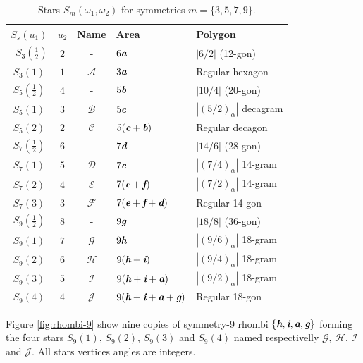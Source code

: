 \documentclass[11pt]{article}
\def\mathbi#1{\textbf{\em #1}}
\begin{document}
\begin{table}[H]
\begin{center}
\begin{tabular}{|c|c|c|l|l|}
\hline
$S_s(u_1)$ & $u_2$ & Name & Area & Polygon \\ \hline\
$S_3(\frac{1}2)$ & $2$ & -     & $6\mathbi{a}$ & $|6/2|$ (12-gon) \\[0.5ex]
$S_3(1)$         & $1$ & $\mathcal{A}$ & $3\mathbi{a}$ & Regular hexagon \\[0.5ex]
\hline
$S_5(\frac{1}2)$ & $4$ & -      & $5\mathbi{b}$ & $|10/4|$ (20-gon)\\[0.5ex]
$S_5(1)$ & $3$ & $\mathcal{B}$ & $5\mathbi{c}$ & $|(5/2)_\alpha|$ decagram\\[0.5ex]
$S_5(2)$ & $2$ & $\mathcal{C}$ & $5(\mathbi{c}+\mathbi{b})$ & Regular decagon\\[0.5ex]
\hline
$S_7(\frac{1}2)$ & $6$ & -     & $7\mathbi{d}$ & $|14/6|$ (28-gon)\\[0.5ex]
$S_7(1)$ & $5$ & $\mathcal{D}$ & $7\mathbi{e}$ & $|(7/4)_\alpha|$ 14-gram\\[0.5ex]
$S_7(2)$ & $4$ & $\mathcal{E}$ & $7(\mathbi{e}+\mathbi{f})$ & $|(7/2)_\alpha|$ 14-gram\\[0.5ex]
$S_7(3)$ & $3$ & $\mathcal{F}$ & $7(\mathbi{e}+\mathbi{f}+\mathbi{d})$ & Regular 14-gon\\[0.5ex]
\hline
$S_9(\frac{1}2)$ & $8$ & -     & $9\mathbi{g}$ & $|18/8|$ (36-gon)\\[0.5ex]
$S_9(1)$ & $7$ & $\mathcal{G}$ & $9\mathbi{h}$ & $|(9/6)_\alpha|$ 18-gram\\[0.5ex]
$S_9(2)$ & $6$ & $\mathcal{H}$ & $9(\mathbi{h}+\mathbi{i})$ & $|(9/4)_\alpha|$ 18-gram\\[0.5ex]
$S_9(3)$ & $5$ & $\mathcal{I}$ & $9(\mathbi{h}+\mathbi{i}+\mathbi{a})$ & $|(9/2)_\alpha|$ 18-gram\\[0.5ex]
$S_9(4)$ & $4$ & $\mathcal{J}$ & $9(\mathbi{h}+\mathbi{i}+\mathbi{a}+\mathbi{g})$ & Regular 18-gon\\[0.5ex]
\hline
\end{tabular}
\caption{Stars $S_m(\omega_1,\omega_2)$ for symmetries $m=\{3,5,7,9\}$.}
\label{tbl:stars}
\end{center}
\end{table}

Figure \ref{fig:rhombi-9} show nine copies of symmetry-9 rhombi $\{\mathbi{h},\mathbi{i},\mathbi{a},\mathbi{g}\}$ forming the four stars $S_9(1)$, $S_9(2)$, $S_9(3)$ and $S_9(4)$ named respectivelly $\mathcal{G}$, $\mathcal{H}$, $\mathcal{I}$ and $\mathcal{J}$. All stars vertices angles are integers.
\end{document}
